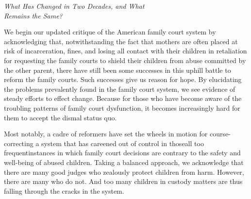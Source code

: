 

\hspace{-5em}\begin{minipage}{1.1\textwidth}
\begin{flushright}
{\fontsize{16}{22}\selectfont
\textbf{%
}
}
\end{flushright}
\end{minipage}


\vspace{6em}



\hspace{-12.5em}\begin{minipage}{1.3\textwidth}
\begin{flushright}
{\fontsize{19}{22}\selectfont
\textsf{\textit{What Has Changed in Two Decades, and What\\\vspace{5pt}
Remains the Same?}}
}
\end{flushright}
\end{minipage}

\vspace{9em}



\pfl{}

\noindent{}We begin our updated critique of the American family court system by
acknowledging that, notwithstanding the fact that mothers are often
placed at risk of incarceration, fines, and losing all contact with their
children in retaliation for requesting the family courts to shield their
children from abuse committed by the other parent, there have still been some successes in this uphill battle to reform the family courts. Such
successes give us reason for hope. By elucidating the problems prevalently found in the family court system, we see evidence of steady efforts
to effect change. Because for those who have become aware of the troubling patterns of family court dysfunction, it becomes increasingly hard for them
to accept the dismal status quo. \pfl{}

Most notably, a cadre of reformers have set the wheels in motion for
course-correcting a system that has careened out of control in those\mdash{}all
too frequent\mdash{}instances in which family court decisions are contrary 
to the safety and well-being of abused
children. Taking a balanced approach, we acknowledge that
there are many good judges who zealously protect children from harm.
However, there are many who do not. And too many children in custody
matters are thus falling through the cracks in the system. \pfl{}

